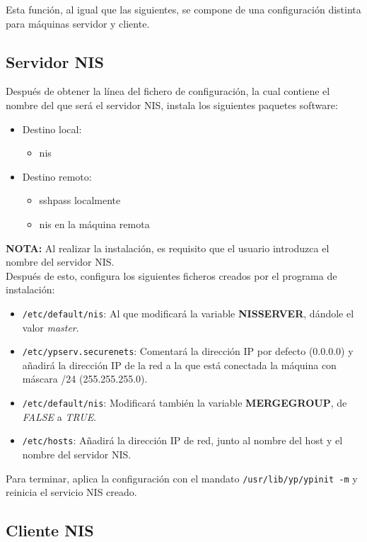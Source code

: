 Esta función, al igual que las siguientes, se compone de una configuración distinta para máquinas servidor y cliente.

\subsection{Servidor NIS}
Después de obtener la línea del fichero de configuración, la cual contiene el nombre del que será el servidor NIS, instala los siguientes paquetes software:
\begin{itemize}
    \item Destino local:
    \begin{itemize}
        \item nis
    \end{itemize}
    \item Destino remoto:
    \begin{itemize}
        \item sshpass localmente
        \item nis en la máquina remota
    \end{itemize}
\end{itemize}
\small{\textbf{NOTA:} Al realizar la instalación, es requisito que el usuario introduzca el nombre del servidor NIS.}\\

Después de esto, configura los siguientes ficheros creados por el programa de instalación\cite{nisserver}:
\begin{itemize}
    \item \texttt{/etc/default/nis}: Al que modificará la variable \textbf{NISSERVER}, dándole el valor \textit{master}.
    \item \texttt{/etc/ypserv.securenets}: Comentará la dirección IP por defecto (0.0.0.0) y añadirá la dirección IP de la red a la que está conectada la máquina con máscara /24 (255.255.255.0).
    \item \texttt{/etc/default/nis}: Modificará también la variable \textbf{MERGEGROUP}, de \textit{FALSE} a \textit{TRUE}.
    \item \texttt{/etc/hosts}: Añadirá la dirección IP de red, junto al nombre del host y el nombre del servidor NIS.
\end{itemize}

Para terminar, aplica la configuración con el mandato \texttt{/usr/lib/yp/ypinit -m} y reinicia el servicio NIS creado.

\subsection{Cliente NIS}
